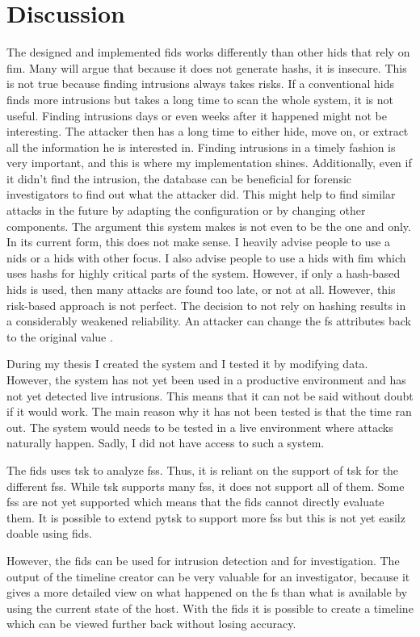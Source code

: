
\chapter{Discussion}
\label{sec:Discussion}


The designed and implemented \gls{fids} works differently than other \gls{hids} that rely on \gls{fim}. Many will argue that because it does not generate \glspl{hash}, it is insecure. This is not true because finding intrusions always takes risks. If a conventional \gls{hids} finds more intrusions but takes a long time to scan the whole system, it is not useful. Finding intrusions days or even weeks after it happened might not be interesting. The attacker then has a long time to either hide, move on, or extract all the information he is interested in. Finding intrusions in a timely fashion is very important, and this is where my implementation shines. Additionally, even if it didn't find the intrusion, the database can be beneficial for forensic investigators to find out what the attacker did. This might help to find similar attacks in the future by adapting the configuration or by changing other components. The argument this system makes is not even to be the one and only. In its current form, this does not make sense. I heavily advise people to use a \gls{nids} or a \gls{hids} with other focus. I also advise people to use a \gls{hids} with \gls{fim} which uses \glspl{hash} for highly critical parts of the system. However, if only a hash-based \gls{hids} is used, then many attacks are found too late, or not at all. However, this risk-based approach is not perfect. The decision to not rely on hashing results in a considerably weakened reliability. An attacker can change the \gls{fs} attributes back to the original value \cite{changing:attributes}. 

During my thesis I created the system and I tested it by modifying data. However, the system has not yet been used in a productive environment and has not yet detected live intrusions. This means that it can not be said without doubt if it would work. The main reason why it has not been tested is that the time ran out. The system would needs to be tested in a live environment where attacks naturally happen. Sadly, I did not have access to such a system. 

The \gls{fids} uses \gls{tsk} to analyze \glspl{fs}. Thus, it is reliant on the support of \gls{tsk} for the different \glspl{fs}. While \gls{tsk} supports many \glspl{fs}, it does not support all of them. Some \glspl{fs} are not yet supported which means that the \gls{fids} cannot directly evaluate them. It is possible to extend \gls{pytsk} to support more \glspl{fs} but this is not yet easilz doable using \gls{fids}. 

However, the \gls{fids} can be used for intrusion detection and for investigation. The output of the timeline creator can be very valuable for an investigator, because it gives a more detailed view on what happened on the \gls{fs} than what is available by using the current state of the host. With the \gls{fids} it is possible to create a timeline which can be viewed further back without losing accuracy. 
